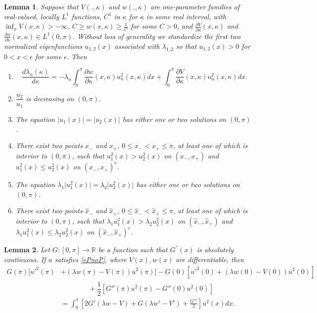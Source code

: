 \documentclass[10pt,a4paper]{amsart}
\newtheorem{lem}{Lemma}
\begin{document}
\begin{lem}\label{F-H}
Suppose that $V(.,\kappa)$ and $w(.,\kappa)$ are one-parameter families of real-valued, locally $L^1$ functions, \( C^1 \) in \( \kappa \) for \( \kappa \) in some real interval, with
$\inf_{x} V(x,\kappa) > - \infty$, $C \ge w(x,\kappa) \ge \frac 1 C$ for some $C > 0$, and
$\frac{\partial V}{\partial \kappa}(x,\kappa)$
and $\frac{\partial w}{\partial \kappa}(x,\kappa) \in L^1(0, \pi)$. Without loss of generality we standardize the first two normalized eigenfunctions $u_{1,2}(x)$ associated with 
$\lambda_{1,2}$
so that
$u_{1,2}(x) > 0$ for $0 < x < \epsilon$ for some $\epsilon$.  Then
\begin{enumerate}
\item \[
\frac{d\lambda_{n}(\kappa)}{d\kappa}=-\lambda_{n}\int_{0}^{\pi}\frac{\partial w}{\partial \kappa}(x,\kappa)u_{n}^{2}(x,\kappa)dx+\int_{0}^{\pi}\frac{\partial V}{\partial \kappa}(x,\kappa)u_{n}^{2}(x,\kappa)dx .
\]
\item
$\dfrac{u_{2}}{u_{1}} $ is decreasing on $(0,\pi)$.

\item The equation $ \vert u_{1}(x)\vert=\vert u_{2}(x)\vert $ has
either one or two solutions on $(0,\pi)$.
 \item There exist two points $x_{-}$ and $x_{+}$,
  $ 0 \leq x_{-}< x_{+} \leq \pi $, at least one of which is interior to $(0, \pi)$, such that 
$u_{1}^{2}(x)>u_{2}^{2}(x)$ on $(x_{-},x_{+})$ and $u_{1}^{2}(x)\le u_{2}^{2}(x)$ on $(x_{-},x_{+})^c$.
\item
The equation $ \lambda_1 \vert u_{1}^2(x)\vert=\lambda_2 \vert u_{2}^2(x)\vert $ has
either one or two
solutions on $(0,\pi)$.
 \item 
There exist two points $\widehat{x}_{-}$ and $\widehat{x}_{+}$,
  $ 0 \leq \widehat{x}_{-}< \widehat{x}_{+} \leq \pi $, at least one of which is interior to $(0, \pi)$, such that 
$\lambda_1 u_{1}^{2}(x)> \lambda_2 u_{2}^{2}(x)$ on $(\widehat{x}_{-},\widehat{x}_{+})$ and $\lambda_1 u_{1}^{2}(x)\le \lambda_2 u_{2}^{2}(x)$ on $(\widehat{x}_{-},\widehat{x}_{+})^c$.
\end{enumerate}

\end{lem}

\begin{lem}\label{G'''}
Let $G:[0,\pi]\to\mathbb{R}$ be a function such that $G^{''}(x)$ is absolutely continuous. If $u$ satisfies \eqref{ePnoP}, where $V(x),w(x)$ are differentiable, then
\begin{align*}
G(\pi)[u'^{2}(\pi)&+(\lambda w(\pi)-V(\pi))u^{2}(\pi)]-G(0)[u'^{2}(0)+(\lambda w(0)-V(0))u^{2}(0)]\\
&\quad\quad\quad\quad+ \dfrac{1}{2}[G''(\pi)u^{2}(\pi)-G''(0)u^{2}(0)]\\
&=\int_{0}^{\pi}\left[2G'(\lambda w-V)+G(\lambda w'-V')+\frac{G'''}{2}\right]
u^{2}(x)dx.
\end{align*}
\end{lem}
\end{document}
